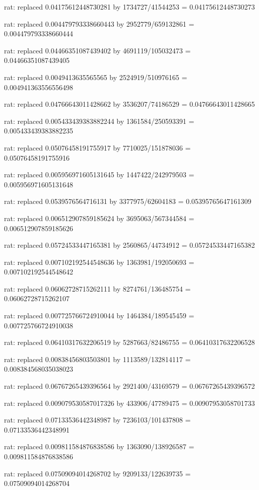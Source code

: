 \documentclass[a4paper,10pt]{article}
\begin{document}
\begin{eulernotebook}
\begin{eulercomment}
\begin{eulercomment}
\begin{eulercomment}
\begin{eulercomment}
\begin{eulercomment}
\begin{eulercomment}
\begin{eulercomment}
\begin{eulercomment}
\begin{eulercomment}
\begin{eulercomment}
\begin{eulercomment}
\begin{eulercomment}
\begin{eulercomment}
\begin{eulercomment}
\begin{eulercomment}
\begin{eulercomment}
\begin{euleroutput}
  rat: replaced 0.04175612448730281 by 1734727/41544253 = 0.04175612448730273
  
  rat: replaced 0.004479793338660443 by 2952779/659132861 = 0.004479793338660444
  
  rat: replaced 0.04466351087439402 by 4691119/105032473 = 0.04466351087439405
  
  rat: replaced 0.0049413635565565 by 2524919/510976165 = 0.004941363556556498
  
  rat: replaced 0.04766643011428662 by 3536207/74186529 = 0.04766643011428665
  
  rat: replaced 0.005433439383882244 by 1361584/250593391 = 0.005433439383882235
  
  rat: replaced 0.05076458191755917 by 7710025/151878036 = 0.05076458191755916
  
  rat: replaced 0.005956971605131645 by 1447422/242979503 = 0.005956971605131648
  
  rat: replaced 0.0539576564716131 by 3377975/62604183 = 0.05395765647161309
  
  rat: replaced 0.006512907859185624 by 3695063/567344584 = 0.006512907859185626
  
  rat: replaced 0.05724533447165381 by 2560865/44734912 = 0.05724533447165382
  
  rat: replaced 0.007102192544548636 by 1363981/192050693 = 0.007102192544548642
  
  rat: replaced 0.06062728715262111 by 8274761/136485754 = 0.06062728715262107
  
  rat: replaced 0.007725766724910044 by 1464384/189545459 = 0.007725766724910038
  
  rat: replaced 0.06410317632206519 by 5287663/82486755 = 0.06410317632206528
  
  rat: replaced 0.00838456803503801 by 1113589/132814117 = 0.008384568035038023
  
  rat: replaced 0.06767265439396564 by 2921400/43169579 = 0.06767265439396572
  
  rat: replaced 0.009079530587017326 by 433906/47789475 = 0.00907953058701733
  
  rat: replaced 0.07133536442348987 by 7236103/101437808 = 0.07133536442348991
  
  rat: replaced 0.009811584876838586 by 1363090/138926587 = 0.009811584876838586
  
  rat: replaced 0.07509094014268702 by 9209133/122639735 = 0.07509094014268704
  

\end{euleroutput}
\end{eulercomment}
\end{eulercomment}
\end{eulercomment}
\end{eulercomment}
\end{eulercomment}
\end{eulercomment}
\end{eulercomment}
\end{eulercomment}
\end{eulercomment}
\end{eulercomment}
\end{eulercomment}
\end{eulercomment}
\end{eulercomment}
\end{eulercomment}
\end{eulercomment}
\end{eulercomment}
\end{eulernotebook}
\end{document}
